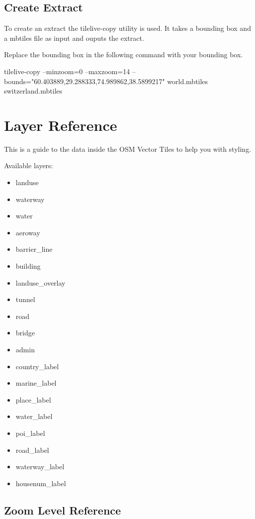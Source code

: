 \subsection{Create Extract}\label{create-extract}

To create an extract the tilelive-copy utility is used. It takes a
bounding box and a mbtiles file as input and ouputs the extract.

Replace the bounding box in the following command with your bounding
box.

\begin{bashcode}
tilelive-copy --minzoom=0 --maxzoom=14 --bounds="60.403889,29.288333,74.989862,38.5899217" 
world.mbtiles switzerland.mbtiles
\end{bashcode}
\newpage

\section{Layer Reference}\label{layer-reference}

This is a guide to the data inside the OSM Vector Tiles to help you with
styling.

Available layers:

\begin{itemize}
\item
  landuse
\item
  waterway
\item
  water
\item
  aeroway
\item
  barrier\_line
\item
  building
\item
  landuse\_overlay
\item
  tunnel
\item
  road
\item
  bridge
\item
  admin
\item
  country\_label
\item
  marine\_label
\item
  place\_label
\item
  water\_label
\item
  poi\_label
\item
  road\_label
\item
  waterway\_label
\item
  housenum\_label
\end{itemize}

\subsection*{Zoom Level Reference}\label{zoom-level-reference}

